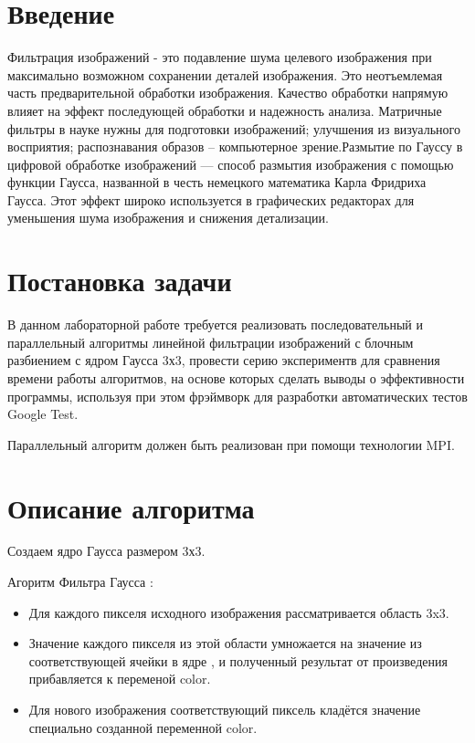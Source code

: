 \documentclass{report}
\begin{document}
\setcounter{page}{2}

\tableofcontents
\newpage

\section*{Введение}
\par Фильтрация изображений - это подавление шума целевого изображения при максимально возможном сохранении деталей изображения. Это неотъемлемая часть предварительной обработки изображения. Качество обработки напрямую влияет на эффект последующей обработки и надежность анализа. Матричные фильтры в науке нужны для подготовки изображений; улучшения из визуального восприятия; распознавания образов – компьютерное зрение.Размытие по Гауссу в цифровой обработке изображений — способ размытия изображения с помощью функции Гаусса, названной в честь немецкого математика Карла Фридриха Гаусса.
Этот эффект широко используется в графических редакторах для уменьшения шума изображения и снижения детализации. 
\newpage

\section*{Постановка задачи}
\par В данном лабораторной работе требуется реализовать последовательный и параллельный алгоритмы линейной фильтрации изображений с блочным разбиением с ядром Гаусса 3х3, провести серию экспериментв для сравнения времени работы алгоритмов, на основе которых сделать выводы о эффективности программы, используя при этом фрэймворк для разработки автоматических тестов Google Test.
\par Параллельный алгоритм должен быть реализован при помощи технологии MPI.
\newpage

\section*{Описание алгоритма}
\par 
Создаем ядро Гаусса размером 3х3. 
\par Агоритм Фильтра Гаусса :
\begin{itemize}
\item Для каждого пикселя исходного изображения рассматривается область 3x3. 
\item Значение каждого пикселя из этой области умножается на значение из соответствующей ячейки в ядре , и полученный результат от произведения прибавляется к переменой color. 
\item Для нового изображения соответствующий пиксель кладётся значение специально созданной переменной color.
\end{itemize}
\end{document}
